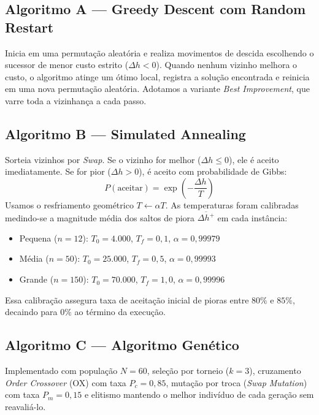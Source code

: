 \documentclass[11pt,a4paper]{article}
\begin{document}
\subsection{Algoritmo A --- Greedy Descent com Random Restart}
Inicia em uma permutação aleatória e realiza movimentos de descida escolhendo o sucessor de menor custo estrito ($\Delta h < 0$). Quando nenhum vizinho melhora o custo, o algoritmo atinge um ótimo local, registra a solução encontrada e reinicia em uma nova permutação aleatória. Adotamos a variante \textit{Best Improvement}, que varre toda a vizinhança a cada passo.

\subsection{Algoritmo B --- Simulated Annealing}
Sorteia vizinhos por \textit{Swap}. Se o vizinho for melhor ($\Delta h \le 0$), ele é aceito imediatamente. Se for pior ($\Delta h > 0$), é aceito com probabilidade de Gibbs:
\begin{equation}
P(\text{aceitar}) = \exp\left(-\frac{\Delta h}{T}\right)
\end{equation}
Usamos o resfriamento geométrico $T \leftarrow \alpha T$. As temperaturas foram calibradas medindo-se a magnitude média dos saltos de piora $\overline{\Delta h^+}$ em cada instância:
\begin{itemize}
    \item Pequena ($n=12$): $T_0 = 4.000$, $T_f = 0,1$, $\alpha = 0,99979$
    \item Média ($n=50$): $T_0 = 25.000$, $T_f = 0,5$, $\alpha = 0,99993$
    \item Grande ($n=150$): $T_0 = 70.000$, $T_f = 1,0$, $\alpha = 0,99996$
\end{itemize}
Essa calibração assegura taxa de aceitação inicial de pioras entre $80\%$ e $85\%$, decaindo para $0\%$ ao término da execução.

\subsection{Algoritmo C --- Algoritmo Genético}
Implementado com população $N = 60$, seleção por torneio ($k = 3$), cruzamento \textit{Order Crossover} (OX) com taxa $P_c = 0,85$, mutação por troca (\textit{Swap Mutation}) com taxa $P_m = 0,15$ e elitismo mantendo o melhor indivíduo de cada geração sem reavaliá-lo.
\end{document}
